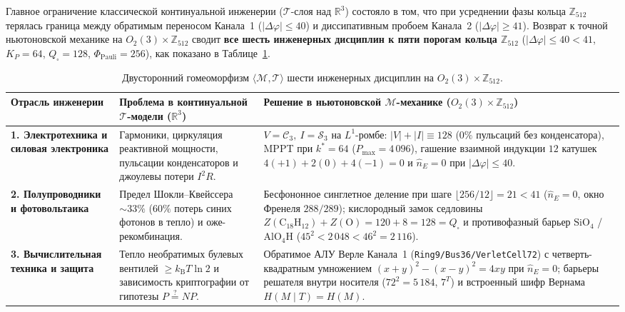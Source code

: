 Главное ограничение классической континуальной инженерии ($\mathcal{T}$-слоя над $\mathbb{R}^3$) состояло в том, что при усреднении фазы кольца $\mathbb{Z}_{512}$ терялась граница между обратимым переносом Канала~1 ($|\Delta\varphi|\le 40$) и диссипативным пробоем Канала~2 ($|\Delta\varphi|\ge 41$). Возврат к точной ньютоновской механике на $O_2(3)\times\mathbb{Z}_{512}$ сводит \textbf{все шесть инженерных дисциплин к пяти порогам кольца $\mathbb{Z}_{512}$} ($|\Delta\varphi|\le 40 < 41$, $K_P = 64$, $Q_\square = 128$, $\Phi_{\mathrm{Pauli}} = 256$), как показано в Таблице~\ref{tab:book-eng-homeomorphism}.

\begin{table}[htbp]
\centering
\caption{Двусторонний гомеоморфизм $\langle\mathcal{M},\mathcal{T}\rangle$ шести инженерных дисциплин на $O_2(3)\times\mathbb{Z}_{512}$.}
\label{tab:book-eng-homeomorphism}
\footnotesize
\begin{tabular}{@{}p{}p{}p{}@{}}
\toprule
\textbf{Отрасль инженерии} & \textbf{Проблема в континуальной $\mathcal{T}$-модели ($\mathbb{R}^3$)} & \textbf{Решение в ньютоновской $\mathcal{M}$-механике ($O_2(3)\times\mathbb{Z}_{512}$)} \\
\midrule
\textbf{1. Электротехника и силовая электроника} &
Гармоники, циркуляция реактивной мощности, пульсации конденсаторов и джоулевы потери $I^2 R$. &
$V=\mathcal{C}_3,\ I=\mathcal{S}_3$ на $L^1$-ромбе: $|V|+|I|\equiv 128$ ($0\%$ пульсаций без конденсатора), MPPT при $k^*=64$ ($P_{\max}=4\,096$), гашение взаимной индукции $12$ катушек $4(+1)+2(0)+4(-1)=0$ и $\hat{n}_E=0$ при $|\Delta\varphi|\le 40$. \\
\addlinespace[3pt]
\textbf{2. Полупроводники и фотовольтаика} &
Предел Шокли--Квейссера $\sim 33\%$ ($60\%$ потерь синих фотонов в тепло) и оже-рекомбинация. &
Бесфононное синглетное деление при шаге $\lfloor 256/12\rfloor = 21 < 41$ ($\hat{n}_E=0$, окно Френеля $288/289$); кислородный замок седловины $Z(\mathrm{C_{18}H_{12}})+Z(\mathrm{O})=120+8=128=Q_\square$ и противофазный барьер $\mathrm{SiO}_4$ / $\mathrm{AlO_4H}$ ($45^2 < 2\,048 < 46^2 = 2\,116$). \\
\addlinespace[3pt]
\textbf{3. Вычислительная техника и защита} &
Тепло необратимых булевых вентилей $\ge k_{\mathrm{B}}T\ln 2$ и зависимость криптографии от гипотезы $P\stackrel{?}{=}NP$. &
Обратимое АЛУ Верле Канала~1 (\texttt{Ring9/Bus36/VerletCell72}) с четверть-квадратным умножением $(x+y)^2-(x-y)^2=4xy$ при $\hat{n}_E=0$; барьеры решателя внутри носителя ($72^2=5\,184$, $7^T$) и встроенный шифр Вернама $H(M\mid T)=H(M)$. \\

\end{tabular}
\end{table}
